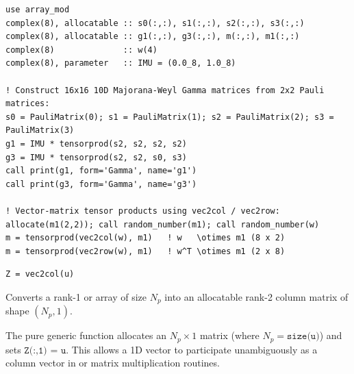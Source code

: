 \begin{description}[leftmargin=2.2cm, style=nextline]
\end{description}

\lstset{language=[95]Fortran}
\begin{lstlisting}
use array_mod
complex(8), allocatable :: s0(:,:), s1(:,:), s2(:,:), s3(:,:)
complex(8), allocatable :: g1(:,:), g3(:,:), m(:,:), m1(:,:)
complex(8)              :: w(4)
complex(8), parameter   :: IMU = (0.0_8, 1.0_8)

! Construct 16x16 10D Majorana-Weyl Gamma matrices from 2x2 Pauli matrices:
s0 = PauliMatrix(0); s1 = PauliMatrix(1); s2 = PauliMatrix(2); s3 = PauliMatrix(3)
g1 = IMU * tensorprod(s2, s2, s2, s2)
g3 = IMU * tensorprod(s2, s2, s0, s3)
call print(g1, form='Gamma', name='g1')
call print(g3, form='Gamma', name='g3')

! Vector-matrix tensor products using vec2col / vec2row:
allocate(m1(2,2)); call random_number(m1); call random_number(w)
m = tensorprod(vec2col(w), m1)   ! w   \otimes m1 (8 x 2)
m = tensorprod(vec2row(w), m1)   ! w^T \otimes m1 (2 x 8)
\end{lstlisting}


\lstset{language=[95]Fortran}
\begin{lstlisting}
Z = vec2col(u)
\end{lstlisting}

Converts a rank-1  or  array  of size $N_p$ into an allocatable rank-2 column matrix  of shape $(N_p, 1)$.

The pure generic function  allocates an $N_p\times 1$ matrix  (where $N_p = \texttt{size(u)}$) and sets $\texttt{Z(:,1) = u}$. This allows a 1D vector to participate unambiguously as a column vector in  or matrix multiplication routines.

